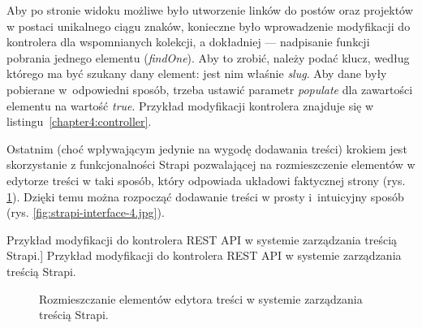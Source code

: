 \documentclass[a4paper, 12pt, twoside]{article}
\numberwithin{figure}{section}
\begin{document}
\begin{sloppypar}
Aby po stronie widoku możliwe było utworzenie linków do postów oraz projektów w postaci unikalnego ciągu znaków, konieczne było wprowadzenie modyfikacji do kontrolera dla wspomnianych kolekcji, a dokładniej --- nadpisanie funkcji pobrania jednego elementu (\textit{findOne}). Aby to zrobić, należy podać klucz, według którego ma być szukany dany element: jest nim właśnie \textit{slug}. Aby dane były pobierane w~odpowiedni sposób, trzeba ustawić parametr \textit{populate} dla zawartości elementu na wartość \textit{true}. Przykład modyfikacji kontrolera znajduje się w listingu~\ref{chapter4:controller}. 

Ostatnim (choć wpływającym jedynie na wygodę dodawania treści) krokiem jest skorzystanie z funkcjonalności Strapi pozwalającej na rozmieszczenie elementów w edytorze treści w taki sposób, który odpowiada układowi faktycznej strony (rys. \ref{fig:strapi-interface-3.jpg}). Dzięki temu można rozpocząć dodawanie treści w prosty i~intuicyjny sposób (rys. \ref{fig:strapi-interface-4.jpg}).

\begin{code}[htbp]
    
    \caption
    [Przykład modyfikacji do kontrolera REST API w systemie zarządzania treścią Strapi.]
    {Przykład modyfikacji do kontrolera REST API w systemie zarządzania treścią Strapi.}
    \label{chapter4:controller}
\end{code}

\begin{figure}[H] 
    \centering
   \caption{Rozmieszczanie elementów edytora treści w systemie zarządzania treścią Strapi.}
   \label{fig:strapi-interface-3.jpg}
\end{figure}


\end{sloppypar}
\end{document}
